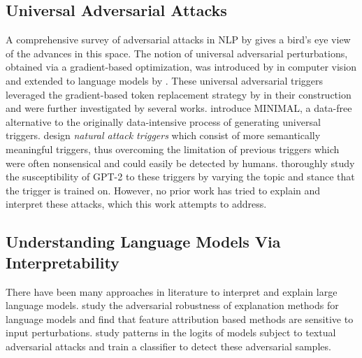\documentclass{article}
\theoremstyle{plain}
\theoremstyle{definition}
\theoremstyle{remark}
\begin{document}
\subsection{Universal Adversarial Attacks}
A comprehensive survey of adversarial attacks in NLP by \cite{Zhang2019Survey} gives a bird’s eye view of the advances in this space. The notion of universal adversarial perturbations, obtained via a gradient-based optimization, was introduced by \cite{Moosavi-Dezfooli16} in computer vision and extended to language models by \cite{Wallace2019}. These universal adversarial triggers leveraged the gradient-based token replacement strategy by \cite{Ebrahimi2017HotFlip} in their construction and were further investigated by several works. \cite{Singla2022MINIMALMM} introduce MINIMAL, a data-free alternative to the originally data-intensive process of generating universal triggers. \cite{Song2021UniversalAA} design \emph{natural attack triggers} which consist of more semantically meaningful triggers, thus overcoming the limitation of previous triggers which were often nonsensical and could easily be detected by humans. \cite{Heidenreich2021} thoroughly study the susceptibility of GPT-2 to these triggers by varying the topic and stance that the trigger is trained on. However, no prior work has tried to explain and interpret these attacks, which this work attempts to address.

\subsection{Understanding Language Models Via Interpretability}

There have been many approaches in literature to interpret and explain large language models. \cite{Atmakuri2022Robustness} study the adversarial robustness of explanation methods for language models and find that feature attribution based methods are sensitive to input perturbations. \cite{Mosca2022Logits} study patterns in the logits of models subject to textual adversarial attacks and train a classifier to detect these adversarial samples.
\end{document}
